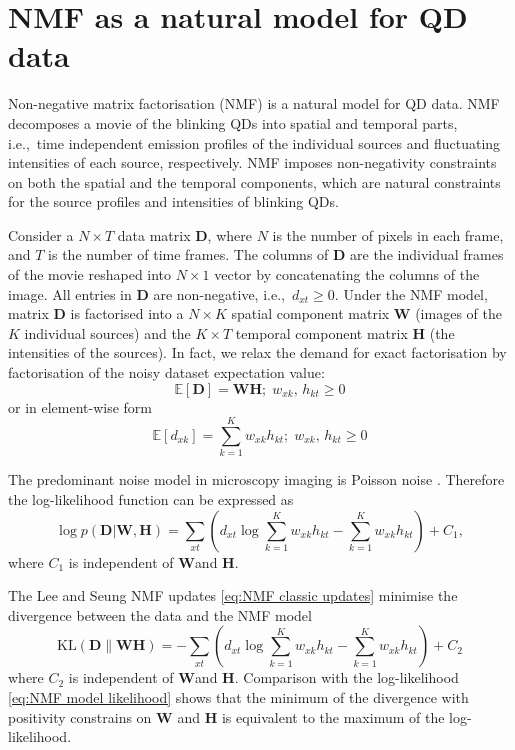 \clearpage
\section{NMF as a natural model for QD data\label{sec: NMF}}
Non-negative matrix factorisation (NMF) \cite{Lee1999,Lee2001} is a natural model for QD data. NMF decomposes a movie of the blinking QDs into spatial and temporal parts, i.e.,\ time independent emission profiles of the individual sources and fluctuating intensities of each source, respectively. NMF imposes non-negativity constraints on both the spatial and the temporal components, which are natural constraints for the source profiles and intensities of blinking QDs.

Consider a $N\times T$ data matrix $\bm{D}$, where $N$ is the number of pixels in each frame, and $T$ is the number of time frames. The columns of $\bm{D}$ are the individual frames of the movie reshaped into $N\times 1$ vector by concatenating the columns of the image. All entries in $\bm{D}$ are non-negative, i.e.,\ $d_{xt}\geq 0$. Under the NMF model, matrix $\bm{D}$ is factorised into a $N\times K$ spatial component matrix $\bm{W}$ (images of the $K$ individual sources) and the $K\times T$ temporal component matrix $\bm{H}$ (the intensities of the sources). In fact, we relax the demand for exact factorisation by factorisation of the noisy dataset expectation value:  
%
\begin{equation}
	\mathbb{E}\left[\bm{D}\right]=\bm{WH};\;w_{xk},\, h_{kt}\geq0
	\label{eq:NMF model}
\end{equation}
%
or in element-wise form
%
\begin{equation}
	\mathbb{E}\left[d_{xk}\right]=\sum_{k=1}^{K}w_{xk}h_{kt};\;w_{xk},\, h_{kt}\geq0
	\label{eq:NMF model element-wise}
\end{equation}

The predominant noise model in microscopy imaging is Poisson noise \cite{PawleyHandbook2006}. Therefore the log-likelihood function can be expressed as
%
\begin{equation}
	\log p(\bm{D}|\bm{W},\bm{H})=\sum_{xt}\left(d_{xt}\log\sum_{k=1}^{K}w_{xk}h_{kt}-\sum_{k=1}^{K}w_{xk}h_{kt}\right)+C_{1},
	\label{eq:NMF model likelihood}
\end{equation}
%
where $C_{1}$ is independent of $\bm{W}$and $\bm{H}$. 

The Lee and Seung NMF updates \autoref{eq:NMF classic updates} minimise the divergence between the data and the NMF model
%
\begin{equation}
	\mbox{KL}(\bm{D}\parallel\bm{WH})=-\sum_{xt}\left(d_{xt}\log\sum_{k=1}^{K}w_{xk}h_{kt}-\sum_{k=1}^{K}w_{xk}h_{kt}\right)+C_{2}
	\label{eq:KL divergence}
\end{equation}
%
where $C_{2}$ is independent of $\bm{W}$and $\bm{H}$. Comparison with the log-likelihood \autoref{eq:NMF model likelihood} shows that the minimum of the divergence with positivity constrains on $\bm{W}$ and $\bm{H}$ is equivalent to the maximum of the log-likelihood. 

